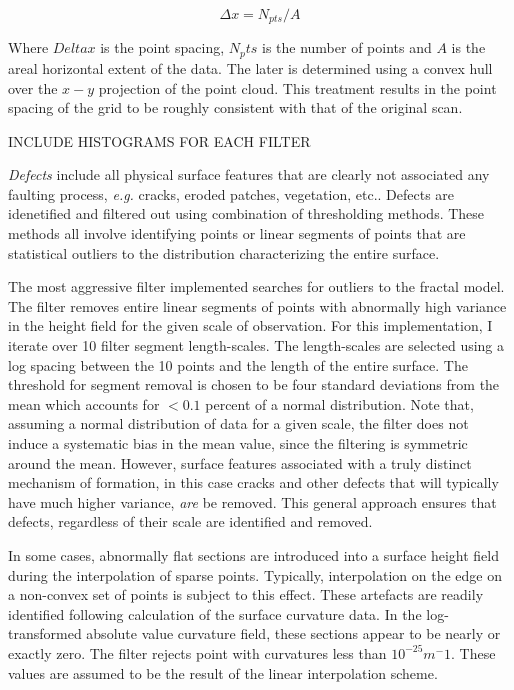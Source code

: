 \documentclass[12pt,a4paper]{article}
\begin{document}
\begin{equation}
	\Delta x = N_{pts}/A
\end{equation}

Where $Delta x$ is the point spacing, $N_pts$ is the number of points and $A$ is the areal horizontal extent of the data. The later is determined using a convex hull over the $x-y$ projection of the point cloud. This treatment results in the point spacing of the grid to be roughly consistent with that of the original scan.

INCLUDE HISTOGRAMS FOR EACH FILTER

\textit{Defects} include all physical surface features that are clearly not associated any faulting process, \textit{e.g.} cracks, eroded patches, vegetation, etc.. Defects are idenetified and filtered out using combination of thresholding methods. These methods all involve identifying points or linear segments of points that are statistical outliers to the distribution characterizing the entire surface. 

The most aggressive filter implemented searches for outliers to the fractal model. The filter removes entire linear segments of points with abnormally high variance in the height field for the given scale of observation. For this implementation, I iterate over 10 filter segment length-scales. The length-scales are selected using a log spacing between the 10 points and the length of the entire surface. The threshold for segment removal is chosen to be four standard deviations from the mean  which accounts for $<0.1$ percent of a normal distribution. Note that, assuming a normal distribution of data for a given scale, the filter does not induce a systematic bias in the mean value, since the filtering is symmetric around the mean. However, surface features associated with a truly distinct mechanism of formation, in this case cracks and other defects that will typically have much higher variance, \textit{are} be removed. This general approach ensures that defects, regardless of their scale are identified and removed.

In some cases, abnormally flat sections are introduced into a surface height field during the interpolation of sparse points. Typically, interpolation on the edge on a non-convex set of points is subject to this effect. These artefacts are readily identified following calculation of the surface curvature data. In the log-transformed absolute value curvature field, these sections appear to be nearly or exactly zero. The filter rejects point with curvatures less than $10^{-25} m^-1$. These values are assumed to be the result of the linear interpolation scheme.
\end{document}
